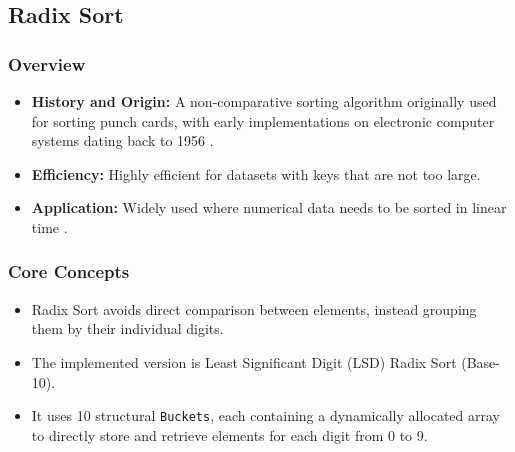 \subsection[Radix Sort]{Radix Sort \cite{cormen2022introduction}}
    \subsubsection{Overview}
        \begin{itemize}
            \item \textbf{History and Origin:} A non-comparative sorting algorithm originally used for sorting punch cards, with early implementations on electronic computer systems dating back to 1956 \cite{friend1956sorting}.
            \item \textbf{Efficiency:} Highly efficient for datasets with keys that are not too large.
            \item \textbf{Application:} Widely used where numerical data needs to be sorted in linear time \cite{cormen2022introduction}.
        \end{itemize}
    \subsubsection{Core Concepts}
        \begin{itemize}
            \item Radix Sort avoids direct comparison between elements, instead grouping them by their individual digits.
            \item The implemented version is Least Significant Digit (LSD) Radix Sort (Base-10).
            \item It uses 10 structural \texttt{Buckets}, each containing a dynamically allocated array to directly store and retrieve elements for each digit from 0 to 9.
        \end{itemize}

